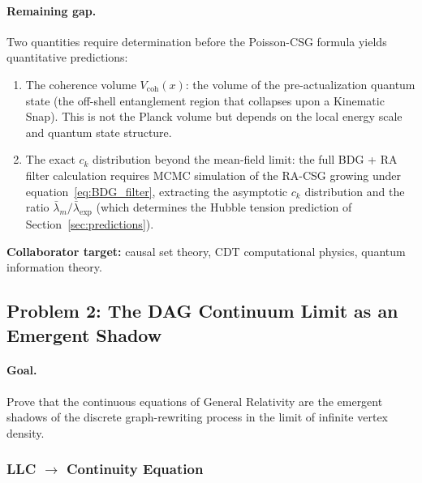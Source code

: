 \documentclass[11pt,a4paper]{article}
\theoremstyle{plain}
\theoremstyle{definition}
\theoremstyle{remark}
\begin{document}
\paragraph{Remaining gap.}
Two quantities require determination before the Poisson-CSG formula yields
quantitative predictions:
\begin{enumerate}
\item The coherence volume $V_{\mathrm{coh}}(x)$: the volume of the
  pre-actualization quantum state (the off-shell entanglement region that
  collapses upon a Kinematic Snap). This is not the Planck volume but depends
  on the local energy scale and quantum state structure.
\item The exact $c_k$ distribution beyond the mean-field limit: the full BDG
  + RA filter calculation requires MCMC simulation of the RA-CSG growing under
  equation~\eqref{eq:BDG_filter}, extracting the asymptotic $c_k$ distribution
  and the ratio $\bar\lambda_m/\bar\lambda_{\mathrm{exp}}$ (which determines
  the Hubble tension prediction of Section~\ref{sec:predictions}).
\end{enumerate}
\textbf{Collaborator target:} causal set theory, CDT computational physics,
quantum information theory.

\subsection{Problem 2: The DAG Continuum Limit as an Emergent Shadow}
\label{sec:continuum}

\paragraph{Goal.} Prove that the continuous equations of General Relativity are
the emergent shadows of the discrete graph-rewriting process in the limit of
infinite vertex density.

\subsubsection{LLC \texorpdfstring{$\to$}{→} Continuity Equation}
\end{document}
